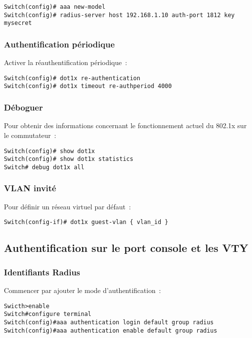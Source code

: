 \begin{lstlisting}
Switch(config)# aaa new-model
Switch(config)# radius-server host 192.168.1.10 auth-port 1812 key mysecret
\end{lstlisting}

\subsubsection{Authentification périodique}

Activer la réauthentification périodique~:

\begin{lstlisting}
Switch(config)# dot1x re-authentication
Switch(config)# dot1x timeout re-authperiod 4000
\end{lstlisting}

\subsubsection{Déboguer}

Pour obtenir des informations concernant le fonctionnement actuel du 802.1x sur le commutateur~:

\begin{lstlisting}
Switch(config)# show dot1x
Switch(config)# show dot1x statistics
Switch# debug dot1x all
\end{lstlisting}

\subsubsection{VLAN invité}

Pour définir un réseau virtuel par défaut~:

\begin{lstlisting}
Switch(config-if)# dot1x guest-vlan { vlan_id }
\end{lstlisting}

\subsection{Authentification sur le port console et les VTY}
\subsubsection{Identifiants Radius}

Commencer par ajouter le mode d'authentification~:

\begin{lstlisting}
Swicth>enable
Switch#configure terminal
Switch(config)#aaa authentication login default group radius
Switch(config)#aaa authentication enable default group radius
\end{lstlisting}

